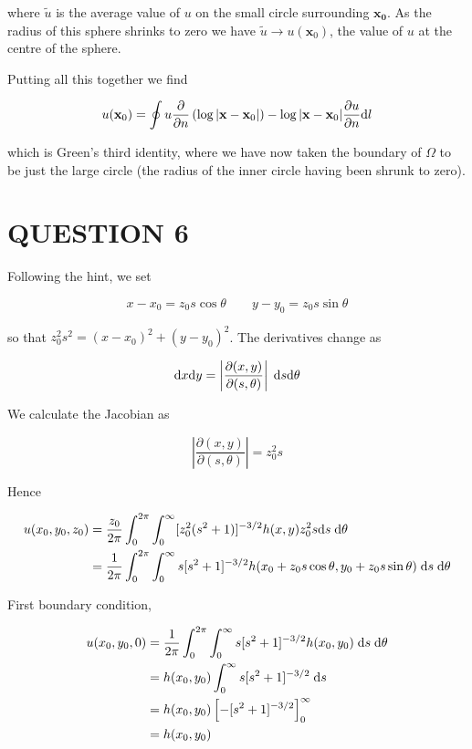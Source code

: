 \documentclass[a4paper]{article}
\begin{document}
where $ \tilde{u} $ is the average value of $ u $ on the small circle surrounding  $ \mathbf{x_{0}} $. As the radius of this sphere shrinks to zero we have $ \tilde{u} \to u(\mathbf{x}_{0}) $, the value of $ u $ at the centre of the sphere. 

Putting all this together we find

\[ u(\mathbf{x}_{0}) = \oint u \frac{\partial }{\partial n} \left(  \log| \mathbf{x} - \mathbf{x}_{0} |   \right) -  \log| \mathbf{x} - \mathbf{x}_{0} |  \frac{\partial u }{\partial n} \mathrm{d} l  \]

which is Green's third identity, where we have now taken the boundary of $ \Omega $ to be just the large circle (the radius of the inner circle having been shrunk to zero).







\section{QUESTION 6}

Following the hint, we set

\[ x - x_{0} = z_{0} s \cos \theta \qquad y - y_{0} = z_{0} s \sin \theta \]

so that $ z_{0}^{2}s^{2} = (x-x_{0})^{2} + (y - y_{0})^{2} $. The derivatives change as 

\[ \mathrm{d} x \mathrm{d} y = \left| \frac{\partial (x,y)}{\partial(s,\theta)} \right|\; \mathrm{d} s \mathrm{d} \theta \]

We calculate the Jacobian as 

\[ \left| \frac{\partial (x,y)}{\partial(s,\theta)} \right| = z_{0}^{2} s \]

Hence

\begin{align*}
u(x_{0},y_{0},z_{0})& = \frac{z_{0}}{2\pi} \int_{0}^{2\pi} \int_{0}^{\infty} [z_{0}^{2}(s^{2} + 1)]^{-3/2} h(x,y) z_{0}^{2} s \mathrm{d} s \; \mathrm{d} \theta  \\
& = \frac{1}{2\pi} \int_{0}^{2\pi} \int_{0}^{\infty} s[s^{2} + 1]^{-3/2} h(x_{0} + z_{0} s \cos \theta, y_{0} + z_{0} s \sin \theta) \; \mathrm{d} s \; \mathrm{d} \theta \\
\end{align*}

First boundary condition,


\begin{align*}
u(x_{0},y_{0},0) & = \frac{1}{2\pi} \int_{0}^{2\pi} \int_{0}^{\infty} s[s^{2} + 1]^{-3/2} h(x_{0}, y_{0}) \; \mathrm{d} s \; \mathrm{d} \theta \\
& = h(x_{0},y_{0}) \int_{0}^{\infty} s[s^{2} + 1]^{-3/2} \; \mathrm{d} s \\
& = h(x_{0},y_{0}) \left[ - [s^{2} + 1]^{-3/2} \right]_{0}^{\infty} \\
& = h(x_{0},y_{0})
\end{align*}
\end{document}
